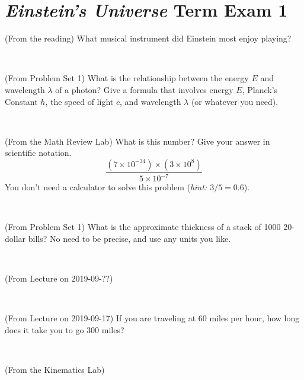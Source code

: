 \documentclass[12pt, letterpaper]{article}
\begin{document}
\section*{\textsl{Einstein's Universe} Term Exam 1}
\setcounter{problem}{1}


\begin{problem} (From the reading)
What musical instrument did Einstein most enjoy playing?
\end{problem}


\vfill ~

\begin{problem} (From Problem Set 1)
What is the relationship between the energy $E$ and wavelength
$\lambda$ of a photon? Give a formula that involves energy $E$,
Planck's Constant $h$, the speed of light $c$, and wavelength
$\lambda$ (or whatever you need).
\end{problem}

\vfill ~

\begin{problem} (From the Math Review Lab)
What is this number? Give your answer in scientific notation.
$$
\frac{(7\times10^{-34})\times(3\times10^8)}{5\times10^{-7}}
$$
You don't need a calculator to solve this problem (\textit{hint: $3/5=0.6$}).
\end{problem}


\vfill ~

\begin{problem} (From Problem Set 1)
What is the approximate thickness of a stack of 1000 20-dollar bills?
No need to be precise, and use any units you like.
\end{problem}


\vfill ~


\clearpage


\begin{problem} (From Lecture on 2019-09-??)
\end{problem}


\vfill ~

\begin{problem} (From Lecture on 2019-09-17)
If you are traveling at 60 miles per hour, how long does
it take you to go 300 miles?
\end{problem}


\vfill ~

\begin{problem} (From the Kinematics Lab)

\end{problem}
\end{document}
